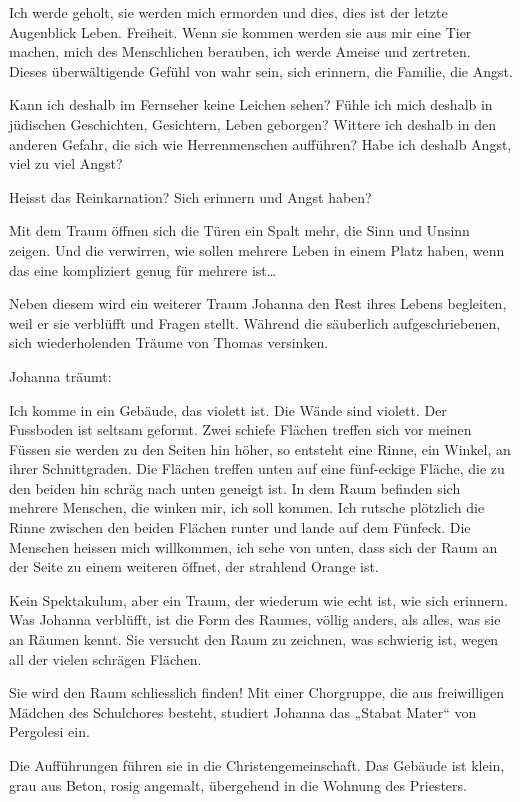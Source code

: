 \documentclass[10pt,a5paper]{book}
\begin{document}
Ich werde geholt, sie werden mich ermorden und dies, dies ist der letzte Augenblick Leben. Freiheit. Wenn sie kommen werden sie aus mir eine Tier machen, mich des Menschlichen berauben, ich werde Ameise und zertreten.
Dieses überwältigende Gefühl von wahr sein, sich erinnern, die Familie, die Angst.

Kann ich deshalb im Fernseher keine Leichen sehen? Fühle ich mich deshalb in jüdischen Geschichten, Gesichtern, Leben geborgen?  Wittere ich deshalb in den anderen Gefahr, die sich wie Herrenmenschen aufführen? Habe ich deshalb Angst, viel zu viel Angst? 

Heisst das Reinkarnation? Sich erinnern und Angst haben?

Mit dem Traum öffnen sich die Türen ein Spalt mehr, die Sinn und Unsinn zeigen. Und die verwirren, wie sollen mehrere Leben in einem Platz haben, wenn das eine kompliziert genug für mehrere ist\dots 

Neben diesem wird ein weiterer Traum Johanna den Rest ihres Lebens begleiten, weil er sie verblüfft und Fragen stellt. Während die säuberlich aufgeschriebenen, sich wiederholenden Träume von Thomas versinken.

Johanna träumt:

Ich komme in ein Gebäude, das violett ist. Die Wände sind violett. Der Fussboden ist seltsam geformt. Zwei schiefe Flächen treffen sich vor meinen Füssen sie werden zu den Seiten hin höher, so entsteht eine Rinne, ein Winkel, an ihrer Schnittgraden. Die Flächen treffen unten auf eine fünf-eckige Fläche, die zu den beiden hin schräg nach unten geneigt ist. In dem Raum befinden sich mehrere Menschen,  die winken mir, ich soll kommen. Ich rutsche plötzlich die Rinne zwischen den beiden Flächen runter und lande auf dem Fünfeck. Die Menschen heissen mich willkommen, ich sehe von unten, dass sich der Raum an der Seite zu einem weiteren öffnet, der strahlend Orange ist.

 Kein Spektakulum, aber ein Traum, der wiederum wie echt ist, wie sich erinnern. Was Johanna verblüfft, ist die Form des Raumes, völlig anders, als alles, was sie an Räumen kennt. Sie versucht den Raum zu zeichnen, was schwierig ist, wegen all der vielen schrägen Flächen.
 
Sie wird den Raum schliesslich finden! Mit einer Chorgruppe, die aus freiwilligen Mädchen des Schulchores besteht, studiert Johanna das „Stabat Mater“ von Pergolesi ein. 

Die Aufführungen führen sie in die Christengemeinschaft. Das Gebäude ist klein, grau aus Beton, rosig angemalt, übergehend in die Wohnung des Priesters.
\end{document}
